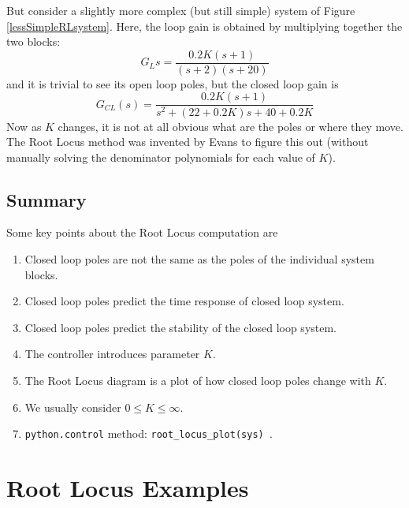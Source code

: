 But consider a slightly more complex (but still simple) system of Figure \ref{lessSimpleRLsystem}.
Here, the loop gain is obtained by multiplying together the two blocks:
\[
G_L{s} = \frac{0.2K(s+1)}{(s+2)(s+20)}
\]
and it is trivial to see its open loop  poles, but the closed loop gain is
\[
G_{CL}(s) = \frac {0.2K(s+1)} {s^2 + (22+0.2K)s+40+0.2K}
\]
Now as $K$ changes,  it is not at all obvious what are the poles or where they move.  The Root Locus method was invented by Evans to figure this out (without manually solving the denominator polynomials for each value of $K$).

\newpage
\subsection{Summary}
Some key points about the  Root Locus computation are

\begin{enumerate}
 \item Closed loop poles are not the same as the poles of the individual system blocks.
 \item Closed loop poles predict the time response of closed loop system.
 \item Closed loop poles predict the stability of the closed loop system.
 \item The controller introduces parameter $K$.
 \item The Root Locus diagram is a plot of how closed loop poles change with $K$.
 \item We usually consider $0 \le K \le \infty$.
 \item {\tt python.control} method:  {\tt root\_locus\_plot(sys) }.
\end{enumerate}





\clearpage\newpage
\section{Root Locus Examples}


